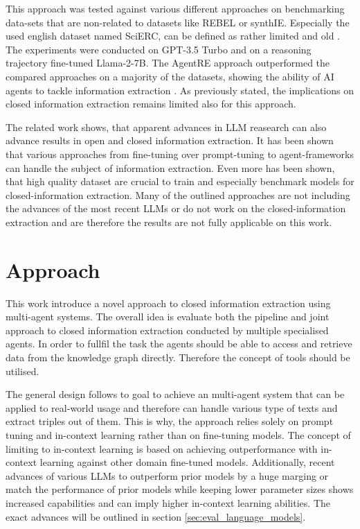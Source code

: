 \documentclass[a4paper,oneside,bibliography=totoc]{scrbook}
\begin{document}
This approach was tested against various different approaches on benchmarking data-sets that are non-related to datasets like REBEL or synthIE. Especially the used english dataset named SciERC, can be defined as rather limited and old \cite{Luan2018}. The experiments were conducted on GPT-3.5 Turbo and on a reasoning trajectory fine-tuned Llama-2-7B. The AgentRE approach outperformed the compared approaches on a majority of the datasets, showing the ability of \ac{AI} agents to tackle information extraction \cite{Shi2024}. As previously stated, the implications on closed information extraction remains limited also for this approach.

The related work shows, that apparent advances in \ac{LLM} reasearch can also advance results in open and closed information extraction. It has been shown that various approaches from fine-tuning over prompt-tuning to agent-frameworks can handle the subject of information extraction. Even more has been shown, that high quality dataset are crucial to train and especially benchmark models for closed-information extraction. Many of the outlined approaches are not including the advances of the most recent \acp{LLM} or do not work on the closed-information extraction and are therefore the results are not fully applicable on this work.

\chapter{Approach}
\label{ch:approach}

This work introduce a novel approach to closed information extraction using multi-agent systems. The overall idea is evaluate both the pipeline and joint approach to closed information extraction conducted by multiple specialised agents. In order to fullfil the task the agents should be able to access and retrieve data from the knowledge graph directly. Therefore the concept of tools should be utilised.

The general design follows to goal to achieve an multi-agent system that can be applied to real-world usage and therefore can handle various type of texts and extract triples out of them. This is why, the approach relies solely on prompt tuning and in-context learning rather than on fine-tuning models. The concept of limiting to in-context learning is based on \citet{Brown2020} achieving outperformance with in-context learning against other domain fine-tuned models. Additionally, recent advances of various \acp{LLM} to outperform prior models by a huge marging or match the performance of prior models while keeping lower parameter sizes \cite{MetaAI2025,Chiang2024} shows increased capabilities and can imply higher in-context learning abilities. The exact advances will be outlined in section \ref{sec:eval_language_models}.
\end{document}

